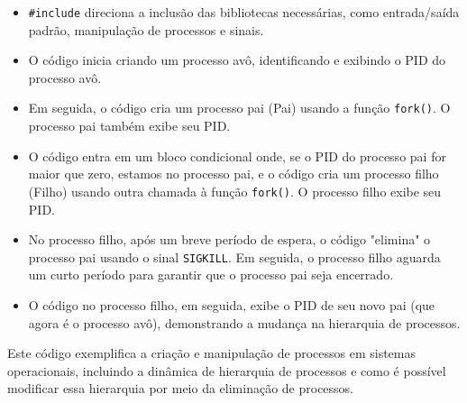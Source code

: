 \documentclass[
	12pt,				%
	openright,			%
	oneside,			%
	a4paper,			%
	chapter=TITLE,		%
	english,			%
	french,				%
	spanish,			%
	brazil				%
	]{abntex2}
\theoremstyle{definition}
\begin{document}
\begin{itemize}
    \item \texttt{\#include} direciona a inclusão das bibliotecas necessárias, como entrada/saída padrão, manipulação de processos e sinais.

    \item O código inicia criando um processo avô, identificando e exibindo o PID do processo avô.

    \item Em seguida, o código cria um processo pai (Pai) usando a função \texttt{fork()}. O processo pai também exibe seu PID.

    \item O código entra em um bloco condicional onde, se o PID do processo pai for maior que zero, estamos no processo pai, e o código cria um processo filho (Filho) usando outra chamada à função \texttt{fork()}. O processo filho exibe seu PID.

    \item No processo filho, após um breve período de espera, o código "elimina" o processo pai usando o sinal \texttt{SIGKILL}. Em seguida, o processo filho aguarda um curto período para garantir que o processo pai seja encerrado.

    \item O código no processo filho, em seguida, exibe o PID de seu novo pai (que agora é o processo avô), demonstrando a mudança na hierarquia de processos.

\end{itemize}

Este código exemplifica a criação e manipulação de processos em sistemas operacionais, incluindo a dinâmica de hierarquia de processos e como é possível modificar essa hierarquia por meio da eliminação de processos.
\end{document}
